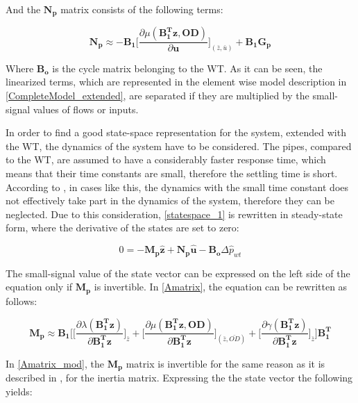 And the $\bm{N_p}$ matrix consists of the following terms:

\begin{equation}
  \bm{N_p} \approx -\bm{B_1} \bigg[ \frac{\partial{\mu(\bm{{B_1^{T}}}\bm{z}, \bm{OD})}}{{\partial{\bm{u}}}}  \bigg]_{(\bar{z}, \bar{u})} + \bm{B_1}\bm{G_p}  
\label{Bumatrix}
\end{equation}

Where $\bm{B_o}$ is the cycle matrix belonging to the WT. As it can be seen, the linearized terms, which are represented in the element wise model description in \eqref{CompleteModel_extended}, are separated if they are multiplied by the small-signal values of flows or inputs. 

In order to find a good state-space representation for the system, extended with the WT, the dynamics of the system have to be considered. The pipes, compared to the WT, are assumed to have a considerably faster response time, which means that their time constants are small, therefore the settling time is short. According to \citep{franklin1994feedback}, in cases like this, the dynamics with the small time constant does not effectively take part in the dynamics of the system, therefore they can be neglected. Due to this consideration, \eqref{statespace_1} is rewritten in steady-state form, where the derivative of the states are set to zero:

\begin{equation}
 0 = -\bm{M_p} \bm{\hat{z}} + \bm{N_p} \bm{\hat{u}} -\bm{B_o} \Delta \hat{p}_{wt}    
 \label{statespace_2}
\end{equation}

The small-signal value of the state vector can be expressed on the left side of the equation only if $\bm{M_p}$ is invertible. In \eqref{Amatrix}, the equation can be rewritten as follows: 

\begin{equation}
  \bm{M_p} \approx \bm{B_1}\Bigg[ \bigg[ \frac{\partial{\lambda(\bm{{B_1^{T}}}\bm{z})}}{{\partial{\bm{{B_1^{T}}}\bm{z}}}}   \bigg]_{\bar{z}} +
\bigg[ \frac{\partial{\mu(\bm{{B_1^{T}}}\bm{z}, \bm{OD})}}{{\partial{\bm{{B_1^{T}}}\bm{z}}}}  \bigg]_{(\bar{z}, \bar{OD})} +  \bigg[ \frac{\partial{\gamma(\bm{{B_1^{T}}}\bm{z})}}{{\partial{\bm{{B_1^{T}}}\bm{z}}}}   \bigg]_{\bar{z}}\Bigg] \bm{{B_1^{T}}}
\label{Amatrix_mod}
\end{equation}

In \eqref{Amatrix_mod}, the $\bm{M_p}$ matrix is invertible for the same reason as it is described in , for the inertia matrix.
Expressing the the state vector the following yields:

